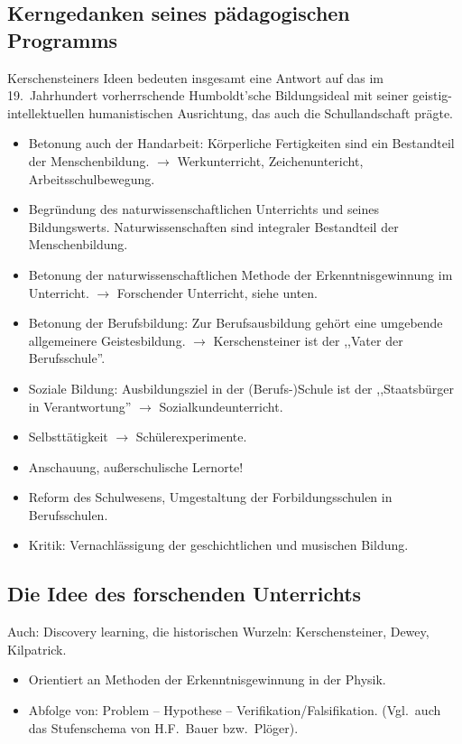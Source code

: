 \subsection{Kerngedanken seines p\"{a}dagogischen Programms}
Kerschensteiners Ideen bedeuten insgesamt eine Antwort auf das
im 19.\ Jahrhundert vorherrschende Humboldt'sche Bildungsideal
mit seiner geistig-intellektuellen humanistischen
Ausrichtung, das auch die Schullandschaft pr\"{a}gte.
\begin{itemize}
\item Betonung auch der Handarbeit: K\"{o}rperliche Fertigkeiten sind
ein Bestandteil der Menschenbildung.
$\to$ Werkunterricht, Zeichenuntericht, Arbeitsschulbewegung.
\item Begr\"{u}ndung des naturwissenschaftlichen Unterrichts und
seines Bildungswerts.
Naturwissenschaften sind integraler Bestandteil der Menschenbildung.
\item Betonung der naturwissenschaftlichen Methode der
Erkenntnisgewinnung im Unterricht.
$\to$ Forschender Unterricht, siehe unten.
\item Betonung der Berufsbildung: Zur Berufsausbildung geh\"{o}rt
eine umgebende allgemeinere Geistesbildung.
$\to$ Kerschensteiner ist der ,,Vater der Berufsschule''.
\item Soziale Bildung: Ausbildungsziel in der (Berufs-)Schule ist
der ,,Staatsb\"{u}rger in Verantwortung'' $\to$ Sozialkundeunterricht.
\item Selbstt\"{a}tigkeit  $\to $ Sch\"{u}lerexperimente.
\item Anschauung, au{\ss}erschulische Lernorte!
\item Reform des Schulwesens, Umgestaltung der Forbildungsschulen
in Berufsschulen.
\item Kritik: Vernachl\"{a}ssigung der geschichtlichen und
musischen Bildung.
\end{itemize}

\subsection{Die Idee des forschenden Unterrichts}
Auch: Discovery learning, die historischen Wurzeln:
Kerschensteiner, Dewey, Kilpatrick.
\begin{itemize}
\item Orientiert an Methoden der Erkenntnisgewinnung in der Physik.
\item
Abfolge von: Problem -- Hypothese -- Verifikation/Falsifikation.
(Vgl.\ auch das Stufenschema von H.F.\ Bauer bzw.\ Pl\"{o}ger).
\end{itemize}

